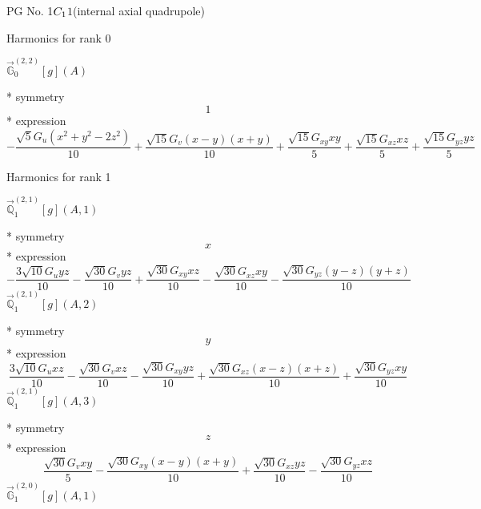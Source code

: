 \documentclass[fleqn,8pt]{jsarticle}
\begin{document}
\setcounter{MaxMatrixCols}{32}

\renewcommand{\tablename}{Table~}
\renewcommand{\figurename}{Figure~}
\begin{center}
\LARGE
PG No. 1\quad$C_{\rm 1}$\quad$1$\quad[ triclinic ] (internal axial quadrupole)
\end{center}

\noindent * Harmonics for rank 0

\noindent\quad $\vec{\mathbb{G}}_{0}^{(2,2)}[g](A)$

\noindent\quad ** symmetry
\begin{dmath*}
1
\end{dmath*}
\noindent\quad ** expression
\begin{dmath*}
- \frac{\sqrt{5} G_{u} \left(x^{2} + y^{2} - 2 z^{2}\right)}{10} + \frac{\sqrt{15} G_{v} \left(x - y\right) \left(x + y\right)}{10} + \frac{\sqrt{15} G_{xy} x y}{5} + \frac{\sqrt{15} G_{xz} x z}{5} + \frac{\sqrt{15} G_{yz} y z}{5}
\end{dmath*}

\noindent * Harmonics for rank 1

\noindent\quad $\vec{\mathbb{Q}}_{1}^{(2,1)}[g](A,1)$

\noindent\quad ** symmetry
\begin{dmath*}
x
\end{dmath*}
\noindent\quad ** expression
\begin{dmath*}
- \frac{3 \sqrt{10} G_{u} y z}{10} - \frac{\sqrt{30} G_{v} y z}{10} + \frac{\sqrt{30} G_{xy} x z}{10} - \frac{\sqrt{30} G_{xz} x y}{10} - \frac{\sqrt{30} G_{yz} \left(y - z\right) \left(y + z\right)}{10}
\end{dmath*}
\noindent\quad $\vec{\mathbb{Q}}_{1}^{(2,1)}[g](A,2)$

\noindent\quad ** symmetry
\begin{dmath*}
y
\end{dmath*}
\noindent\quad ** expression
\begin{dmath*}
\frac{3 \sqrt{10} G_{u} x z}{10} - \frac{\sqrt{30} G_{v} x z}{10} - \frac{\sqrt{30} G_{xy} y z}{10} + \frac{\sqrt{30} G_{xz} \left(x - z\right) \left(x + z\right)}{10} + \frac{\sqrt{30} G_{yz} x y}{10}
\end{dmath*}
\noindent\quad $\vec{\mathbb{Q}}_{1}^{(2,1)}[g](A,3)$

\noindent\quad ** symmetry
\begin{dmath*}
z
\end{dmath*}
\noindent\quad ** expression
\begin{dmath*}
\frac{\sqrt{30} G_{v} x y}{5} - \frac{\sqrt{30} G_{xy} \left(x - y\right) \left(x + y\right)}{10} + \frac{\sqrt{30} G_{xz} y z}{10} - \frac{\sqrt{30} G_{yz} x z}{10}
\end{dmath*}
\noindent\quad $\vec{\mathbb{G}}_{1}^{(2,0)}[g](A,1)$
\end{document}
